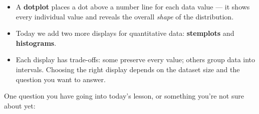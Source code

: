\documentclass[10pt]{article}
\begin{document}
\vspace{0.16in}

\begin{tcolorbox}[colback=greenbg, colframe=greenacc, boxrule=0.8pt, arc=2mm,
    left=4mm, right=4mm, top=3mm, bottom=3mm]
\small
\begin{itemize}[leftmargin=1.3em, itemsep=5pt]
  \item A \textbf{dotplot} places a dot above a number line for each data value ---
        it shows every individual value and reveals the overall \textit{shape} of
        the distribution.
  \item Today we add two more displays for quantitative data:
        \textbf{stemplots} and \textbf{histograms}.
  \item Each display has trade-offs: some preserve every value; others group data
        into intervals. Choosing the right display depends on the dataset size and
        the question you want to answer.
\end{itemize}
\end{tcolorbox}

\vspace{0.14in}

\noindent\textcolor{slate}{\small One question you have going into today's lesson,
or something you're not sure about yet:}\\[8pt]
\writeline
\end{document}
